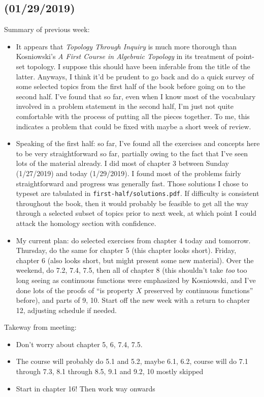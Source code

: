 \documentclass{fkbook}
\begin{document}
\subsection*{(01/29/2019)}
Summary of previous week:
\begin{itemize}
  \item It appears that \emph{Topology Through Inquiry} is much more thorough
    than Kosniowski's \emph{A First Course in Algebraic Topology} in its
    treatment of point-set topology. I suppose this should have been inferable
    from the title of the latter. Anyways, I think it'd be prudent to go back
    and do a quick survey of some selected topics from the first half of the
    book before going on to the second half. I've found that so far, even when
    I know most of the vocabulary involved in a problem statement in the second
    half, I'm just not quite comfortable with the process of putting all the
    pieces together. To me, this indicates a problem that could be fixed with
    maybe a short week of review.

  \item Speaking of the first half: so far, I've found all the exercises and
    concepts here to be very straightforward so far, partially owing to the fact
    that I've seen lots of the material already. I did most of chapter 3 between
    Sunday (1/27/2019) and today (1/29/2019). I found most of the problems
    fairly straightforward and progress was generally fast. Those solutions I
    chose to typeset are tabulated in \texttt{first-half/solutions.pdf}. If
    difficulty is consistent throughout the book, then it would probably be
    feasible to get all the way through a selected subset of topics prior to
    next week, at which point I could attack the homology section with
    confidence.

  \item My current plan: do selected exercises from chapter 4 today and
    tomorrow. Thursday, do the same for chapter 5 (this chapter looks short).
    Friday, chapter 6 (also looks short, but might present some new material).
    Over the weekend, do 7.2, 7.4, 7.5, then all of chapter 8 (this shouldn't
    take \emph{too} too long seeing as continuous functions were emphasized by
    Kosniowski, and I've done lots of the proofs of ``is property $X$ preserved
    by continuous functions'' before), and parts of 9, 10. Start off the new
    week with a return to chapter 12, adjusting schedule if needed.
\end{itemize}
Takeway from meeting:
\begin{itemize}
  \item Don't worry about chapter 5, 6, 7.4, 7.5.
  \item The course will probably do 5.1 and 5.2, maybe 6.1, 6.2, course will do
    7.1 through 7.3, 8.1 through 8.5, 9.1 and 9.2, 10 mostly skipped
  \item Start in chapter 16! Then work way onwards
\end{itemize}
\end{document}
